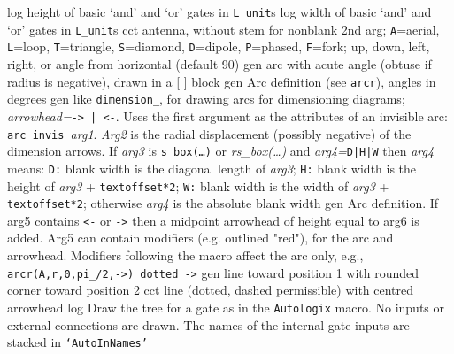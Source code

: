   {log}
  {height of basic `and' and `or' gates in {\tt L\_unit}s}
  {log}
  {width of basic `and' and `or' gates in {\tt L\_unit}s}
  {cct}
  {antenna, without stem for nonblank 2nd arg; {\tt A}=aerial,
    {\tt L}=loop, {\tt T}=triangle, {\tt S}=diamond, {\tt D}=dipole,
    {\tt P}=phased, {\tt F}=fork;
    up, down, left, right, or angle from horizontal (default 90) 
   }
  {gen}
  {arc with acute angle (obtuse if radius is negative), drawn in a [ ] block}
  {gen}
  {Arc definition (see {\tt arcr}), angles in degrees
    }
  {gen}
  {like {\tt dimension\_}, for drawing arcs for dimensioning diagrams;
      {\sl arrowhead=}{\tt -> | <-}. Uses the first argument as the attributes
      of an invisible arc: {\tt arc invis }{\sl arg1}.  {\sl Arg2} is the
      radial displacement (possibly negative) of the dimension arrows.
      If {\sl arg3} is {\tt s\_box(\ldots)} or {\sl rs\_box(\ldots)} and
      {\sl arg4=}{\tt D|H|W} then {\sl arg4} means:
      {\tt D:} blank width is the diagonal length of {\sl arg3};
      {\tt H:} blank width is the height of {\sl arg3} + {\tt textoffset*2};
      {\tt W:} blank width is the width of {\sl arg3} + {\tt textoffset*2};
      otherwise {\sl arg4} is the absolute blank width}
  {gen}
  {Arc definition.  If arg5 contains {\tt <-} or {\tt ->} then a midpoint
    arrowhead of height equal to arg6 is added. Arg5 can contain modifiers
    (e.g. outlined "red"), for the arc and arrowhead.  Modifiers following
    the macro affect the arc only,
    e.g., {\tt arcr(A,r,0,pi\_/2,->) dotted ->}
   }
  {gen}
  {line toward position 1 with rounded corner toward position 2}
  {cct}
  {line (dotted, dashed permissible) with centred arrowhead
    }
  {log}
  {Draw the tree for a gate as in the {\tt Autologix} macro.  No inputs
   or external connections are drawn.  The names of the internal gate
   inputs are stacked in {\tt `AutoInNames'}}
